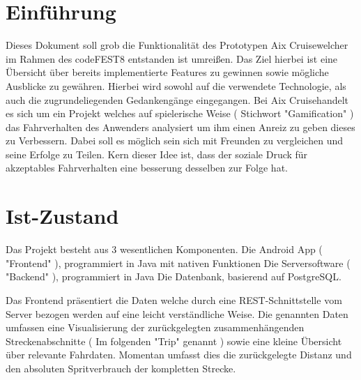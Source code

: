 \documentclass[12pt,a4paper,bibliography=totocnumbered,listof=totocnumbered]{scrartcl}
\begin{document}
\setcounter{page}{1}
\onehalfspacing
{}


\section{Einführung}
Dieses Dokument soll grob die Funktionalität des Prototypen \glqq Aix Cruise\grqq welcher im Rahmen des codeFEST8 entstanden ist umreißen. Das Ziel hierbei ist eine Übersicht über bereits implementierte Features zu gewinnen sowie mögliche Ausblicke zu gewähren. Hierbei wird sowohl auf die verwendete Technologie, als auch die zugrundeliegenden Gedankengänge eingegangen.
Bei \glqq Aix Cruise\grqq handelt es sich um ein Projekt welches auf spielerische Weise ( Stichwort "Gamification" ) das Fahrverhalten des Anwenders analysiert um ihm einen Anreiz zu geben dieses zu Verbessern. 
Dabei soll es möglich sein sich mit Freunden zu vergleichen und seine Erfolge zu Teilen. Kern dieser Idee ist, dass der soziale Druck für akzeptables Fahrverhalten eine besserung desselben zur Folge hat.

\section{Ist-Zustand}
Das Projekt besteht aus 3 wesentlichen Komponenten.
Die Android App ( "Frontend" ), programmiert in Java mit nativen Funktionen
Die Serversoftware ( "Backend" ), programmiert in Java
Die Datenbank, basierend auf PostgreSQL.

Das Frontend präsentiert die Daten welche durch eine REST-Schnittstelle vom Server bezogen werden auf eine leicht verständliche Weise.
Die genannten Daten umfassen eine Visualisierung der zurückgelegten zusammenhängenden Streckenabschnitte ( Im folgenden "Trip" genannt ) sowie eine kleine Übersicht über relevante Fahrdaten. Momentan umfasst dies die zurückgelegte Distanz und den absoluten Spritverbrauch der kompletten Strecke.
\end{document}
